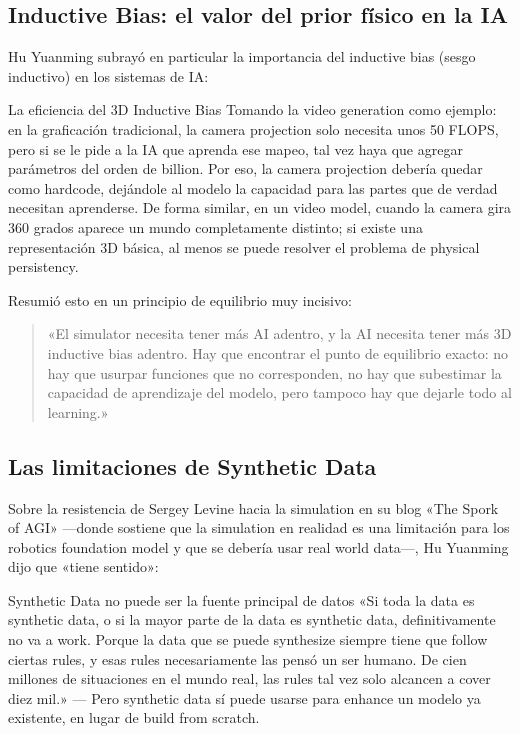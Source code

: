 \documentclass[a4paper]{article}
\begin{document}
\subsection{Inductive Bias: el valor del prior físico en la IA}

Hu Yuanming subrayó en particular la importancia del inductive bias (sesgo inductivo) en los sistemas de IA:

\begin{importantbox}{La eficiencia del 3D Inductive Bias}
Tomando la video generation como ejemplo: en la graficación tradicional, la camera projection solo necesita unos 50 FLOPS, pero si se le pide a la IA que aprenda ese mapeo, tal vez haya que agregar parámetros del orden de billion. Por eso, la camera projection debería quedar como hardcode, dejándole al modelo la capacidad para las partes que de verdad necesitan aprenderse. De forma similar, en un video model, cuando la camera gira 360 grados aparece un mundo completamente distinto; si existe una representación 3D básica, al menos se puede resolver el problema de physical persistency.
\end{importantbox}

Resumió esto en un principio de equilibrio muy incisivo:

\begin{quote}
«El simulator necesita tener más AI adentro, y la AI necesita tener más 3D inductive bias adentro. Hay que encontrar el punto de equilibrio exacto: no hay que usurpar funciones que no corresponden, no hay que subestimar la capacidad de aprendizaje del modelo, pero tampoco hay que dejarle todo al learning.»
\end{quote}

\subsection{Las limitaciones de Synthetic Data}

Sobre la resistencia de Sergey Levine hacia la simulation en su blog «The Spork of AGI» —donde sostiene que la simulation en realidad es una limitación para los robotics foundation model y que se debería usar real world data—, Hu Yuanming dijo que «tiene sentido»:

\begin{warningbox}{Synthetic Data no puede ser la fuente principal de datos}
«Si toda la data es synthetic data, o si la mayor parte de la data es synthetic data, definitivamente no va a work. Porque la data que se puede synthesize siempre tiene que follow ciertas rules, y esas rules necesariamente las pensó un ser humano. De cien millones de situaciones en el mundo real, las rules tal vez solo alcancen a cover diez mil.» — Pero synthetic data sí puede usarse para enhance un modelo ya existente, en lugar de build from scratch.
\end{warningbox}
\end{document}
